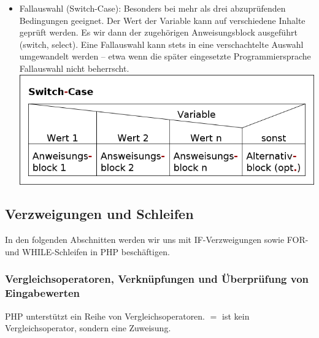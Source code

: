 \begin{itemize}
	\item Fallauswahl (Switch-Case): Besonders bei mehr als drei abzuprüfenden Bedingungen geeignet. Der Wert der Variable kann auf verschiedene Inhalte geprüft werden. Es wir dann der zugehörigen Anweisungsblock ausgeführt (switch, select). Eine Fallauswahl kann stets in eine verschachtelte Auswahl umgewandelt werden -- etwa wenn die später eingesetzte Programmiersprache Fallauswahl nicht beherrscht.\\
\includegraphics[scale=0.5]{pictures/lf06prog-pic/lf06prog-switch-case-struct.png}
\end{itemize}



\subsection{Verzweigungen und Schleifen}

In den folgenden Abschnitten werden wir uns mit IF-Verzweigungen sowie FOR- und WHILE-Schleifen in PHP beschäftigen. 

\subsubsection{Vergleichsoperatoren, Verknüpfungen und Überprüfung von Eingabewerten}

PHP unterstützt ein Reihe von Vergleichsoperatoren. $=$ ist kein Vergleichsoperator, sondern eine Zuweisung.

